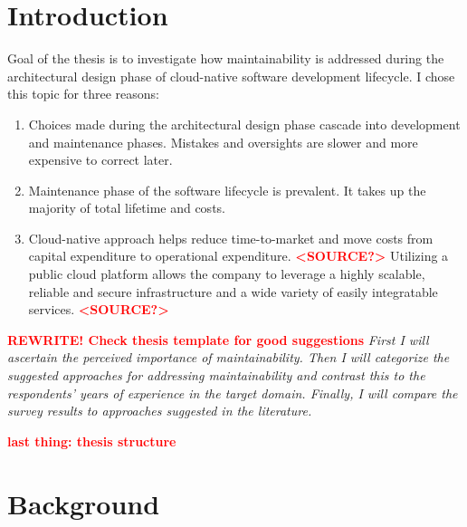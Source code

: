 \documentclass[utf8,english]{gradu3}
\newcommand{\todo}[1]{\textbf{\textcolor{red}{#1}}}
\newcommand{\tmp}[1]{\textit{{#1}}}
\begin{document}
\chapter{Introduction}


Goal of the thesis is to investigate how maintainability is addressed during
the architectural design phase of cloud-native software development lifecycle.
I chose this topic for three reasons:
\begin{enumerate}
  \item Choices made during the architectural design phase cascade into
        development and maintenance phases.
        Mistakes and oversights are slower and more expensive to correct later. \parencite{Bass1998}
  \item Maintenance phase of the software lifecycle is prevalent.
        It takes up the majority of total lifetime and costs. \parencite{Bass1998}
  \item Cloud-native approach helps reduce time-to-market and move costs from
        capital expenditure to operational expenditure. \todo{<SOURCE?>}
        Utilizing a public cloud platform allows the company to leverage a
        highly scalable, reliable and secure infrastructure and a wide variety
        of easily integratable services. \todo{<SOURCE?>}
\end{enumerate}

\todo{REWRITE! Check thesis template for good suggestions}
\tmp{First I will ascertain the perceived importance of maintainability.
  Then I will categorize the suggested approaches for addressing maintainability
  and contrast this to the respondents' years of experience in the target domain.
  Finally, I will compare the survey results to approaches suggested in the literature.}

\todo{last thing: thesis structure}


\chapter{Background}
\end{document}
